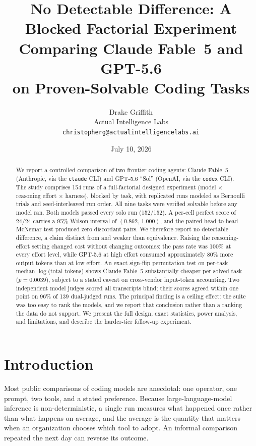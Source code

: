 \documentclass[11pt]{article}
\title{\textbf{No Detectable Difference: A Blocked Factorial Experiment\\
Comparing Claude Fable~5 and GPT-5.6\\
on Proven-Solvable Coding Tasks}}
\author{Drake Griffith\\
\small Actual Intelligence Labs\\
\small \texttt{christopherg@actualintelligencelabs.ai}}
\date{July 10, 2026}
\newcommand{\fable}{Claude Fable~5}
\newcommand{\sol}{GPT-5.6}
\begin{document}
\maketitle

\begin{abstract}
\noindent
We report a controlled comparison of two frontier coding agents:
\fable{} (Anthropic, via the \texttt{claude} CLI) and \sol{} ``Sol''
(OpenAI, via the \texttt{codex} CLI). The study comprises 154 runs of a
full-factorial designed experiment (model $\times$ reasoning effort
$\times$ harness), blocked by task, with replicated runs modeled as
Bernoulli trials and seed-interleaved run order. All nine tasks were
verified solvable before any model ran. Both models passed every solo run
(152/152). A per-cell perfect score of $24/24$ carries a 95\% Wilson
interval of $(0.862,\,1.000)$, and the paired head-to-head McNemar test
produced zero discordant pairs. We therefore report no detectable
difference, a claim distinct from and weaker than equivalence. Raising the
reasoning-effort setting changed cost without changing outcomes: the pass
rate was 100\% at every effort level, while \sol{} at high effort consumed
approximately 80\% more output tokens than at low effort. An exact
sign-flip permutation test on per-task median $\log$(total tokens) shows
\fable{} substantially cheaper per solved task ($p = 0.0039$), subject to a
stated caveat on cross-vendor input-token accounting. Two independent model
judges scored all transcripts blind; their scores agreed within one point
on 96\% of 139 dual-judged runs. The principal finding is a ceiling
effect: the suite was too easy to rank the models, and we report that
conclusion rather than a ranking the data do not support. We present the
full design, exact statistics, power analysis, and limitations, and
describe the harder-tier follow-up experiment.
\end{abstract}

\section{Introduction}

Most public comparisons of coding models are anecdotal: one operator, one
prompt, two tools, and a stated preference. Because large-language-model
inference is non-deterministic, a single run measures what happened once
rather than what happens on average, and the average is the quantity that
matters when an organization chooses which tool to adopt. An informal
comparison repeated the next day can reverse its outcome.
\end{document}
